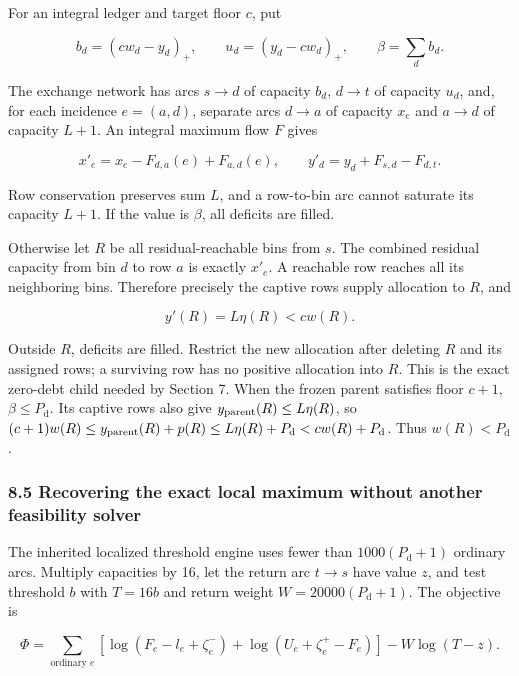 For an integral ledger and target floor \(c\), put

\[
b_d=(cw_d-y_d)_+,\qquad
 u_d=(y_d-cw_d)_+,\qquad \beta=\sum_db_d.
\]

The exchange network has arcs \(s\to d\) of capacity \(b_d\), \(d\to t\) of capacity \(u_d\), and, for each incidence \(e=(a,d)\), separate arcs \(d\to a\) of capacity \(x_e\) and \(a\to d\) of capacity \(L+1\). An integral maximum flow \(F\) gives

\[
x'_e=x_e-F_{d,a}(e)+F_{a,d}(e),\qquad
 y'_d=y_d+F_{s,d}-F_{d,t}.
 \tag{27}
\]

Row conservation preserves sum \(L\), and a row-to-bin arc cannot saturate its capacity \(L+1\). If the value is \(\beta\), all deficits are filled.

Otherwise let \(R\) be all residual-reachable bins from \(s\). The combined residual capacity from bin \(d\) to row \(a\) is exactly \(x'_e\). A reachable row reaches all its neighboring bins. Therefore precisely the captive rows supply allocation to \(R\), and

\[
y'(R)=L\eta(R)<cw(R).
 \tag{28}
\]

Outside \(R\), deficits are filled. Restrict the new allocation after deleting \(R\) and its assigned rows; a surviving row has no positive allocation into \(R\). This is the exact zero-debt child needed by Section 7. When the frozen parent satisfies floor \(c+1\), \(\beta\leq P_{\mathrm d}\). Its captive rows also give \(y_{\rm parent}(R)\leq L\eta(R)\), so \((c+1)w(R)\leq y_{\rm parent}(R)+p(R)\leq L\eta(R)+P_{\mathrm d}<cw(R)+P_{\mathrm d}\). Thus \(w(R)<P_{\mathrm d}\).

\hypertarget{af-46593eb93e-recovering-the-exact-local-maximum-without-another-feasibility-solver}{%
\subsubsection{8.5 Recovering the exact local maximum without another feasibility solver}\label{af-46593eb93e-recovering-the-exact-local-maximum-without-another-feasibility-solver}}

The inherited localized threshold engine uses fewer than \(1000(P_{\mathrm d}+1)\) ordinary arcs. Multiply capacities by 16, let the return arc \(t\to s\) have value \(z\), and test threshold \(b\) with \(T=16b\) and return weight \(W=20000(P_{\mathrm d}+1)\). The objective is

\[
\Phi=\sum_{\text{ordinary }e}
  [\log(F_e-l_e+\zeta_e^-)+\log(U_e+\zeta_e^+-F_e)]
                  -W\log(T-z).
 \tag{29}
\]

